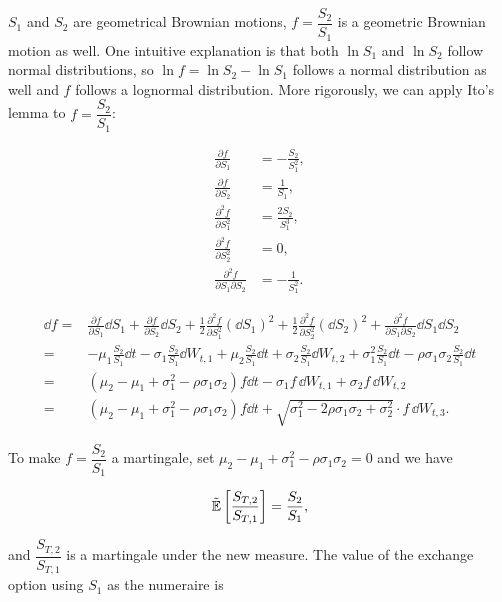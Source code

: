 

$S_1$ and $S_2$ are geometrical Brownian motions, $f=\dfrac{S_2}{S_1}$ is a
geometric Brownian motion as well. One intuitive explanation is that both $\ln S_1$
and $\ln S_2$ follow normal distributions, so $\ln f=\ln S_2-\ln S_1$ follows a
normal distribution as well and $f$ follows a lognormal distribution. More rigorously,
we can apply Ito's lemma to $f=\dfrac{S_2}{S_1}$:

\[
\begin{aligned}
\frac{\partial f}{\partial S_1}&=-\frac{S_2}{S_1^2},\\
\frac{\partial f}{\partial S_2}&=\frac{1}{S_1},\\
\frac{\partial^2 f}{\partial S_1^2}&=\frac{2S_2}{S_1^3},\\
\frac{\partial^2 f}{\partial S_2^2}&=0,\\
\frac{\partial^2 f}{\partial S_1\partial S_2}&=-\frac{1}{S_1^2}.
\end{aligned}
\]

\[
\begin{aligned}
\dd f={}&\frac{\partial f}{\partial S_1}\dd S_1+\frac{\partial f}{\partial S_2}\dd S_2
+\frac{1}{2}\frac{\partial^2 f}{\partial S_1^2}(\dd S_1)^2
+\frac{1}{2}\frac{\partial^2 f}{\partial S_2^2}(\dd S_2)^2
+\frac{\partial^2 f}{\partial S_1\partial S_2}\dd S_1\dd S_2\\
={}&-\mu_1\frac{S_2}{S_1}\dd t-\sigma_1\frac{S_2}{S_1}\dd W_{t,1}
+\mu_2\frac{S_2}{S_1}\dd t+\sigma_2\frac{S_2}{S_1}\dd W_{t,2}
+\sigma_1^2\frac{S_2}{S_1}\dd t-\rho\sigma_1\sigma_2\frac{S_2}{S_1}\dd t\\
={}&\left(\mu_2-\mu_1+\sigma_1^2-\rho\sigma_1\sigma_2\right)f\dd t
-\sigma_1f\,\dd W_{t,1}+\sigma_2f\,\dd W_{t,2}\\
={}&\left(\mu_2-\mu_1+\sigma_1^2-\rho\sigma_1\sigma_2\right)f\dd t
+\sqrt{\sigma_1^2-2\rho\sigma_1\sigma_2+\sigma_2^2}\cdot f\,\dd W_{t,3}.
\end{aligned}
\]

To make $f=\dfrac{S_2}{S_1}$ a martingale, set
$\mu_2-\mu_1+\sigma_1^2-\rho\sigma_1\sigma_2=0$ and we have

\[
\tilde{\mathbb{E}}\left[\frac{S_{T,2}}{S_{T,1}}\right]=\frac{S_2}{S_1},
\]

and $\dfrac{S_{T,2}}{S_{T,1}}$ is a martingale under the new measure. The value of the
exchange option using $S_1$ as the numeraire is

